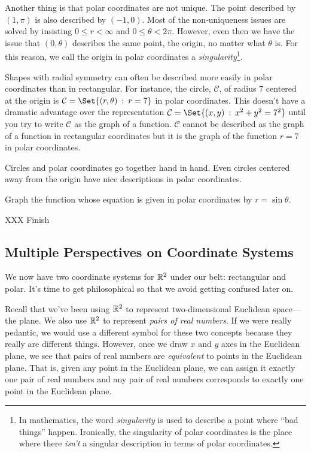 Another thing is that polar coordinates are not unique.  The point described by $(1,\pi)$
is also described by $(-1,0)$.  Most of the non-uniqueness issues are solved by insisting
$0\leq r <\infty$ and $0\leq\theta < 2\pi$.  However, even then we have the issue that
$(0,\theta)$ describes the same point, the origin, no matter what $\theta$ is.  For this reason,
we call the origin in polar coordinates a \emph{singularity}\footnote{ In mathematics, the word
\emph{singularity} is used to describe a point where ``bad things'' happen.  Ironically, the
singularity of polar coordinates is the place where there \emph{isn't} a singular description
in terms of polar coordinates.}.


Shapes with radial symmetry can often be described more easily in polar coordinates than
in rectangular.  For instance, the circle, $\mathcal C$, of radius $7$ centered at the origin is
$\mathcal C=\Set{(r,\theta)\given r=7}$ in polar coordinates.  This doesn't have a dramatic
advantage over the representation $\mathcal C=\Set{(x,y)\given x^2+y^2=7^2}$ until you try to write
$\mathcal C$ as the graph of a function.  $\mathcal C$ cannot be described as the graph of a function
in rectangular coordinates but it is the graph of the function $r=7$ in polar coordinates.

Circles and polar coordinates go together hand in hand.  Even circles centered away from the origin
have nice descriptions in polar coordinates.
\begin{example}
	Graph the function whose equation is given in polar coordinates by $r=\sin\theta$.

	XXX Finish
\end{example}

\subsection{Multiple Perspectives on Coordinate Systems}

We now have two coordinate systems for $\mathbb{R}^2$ under our belt: rectangular and polar.  
It's time to get philosophical so that we avoid getting confused later on.

Recall that we've been using $\mathbb{R}^2$ to represent two-dimensional Euclidean space---the plane.
We also use $\mathbb{R}^2$ to represent \emph{pairs of real numbers}.  If we were really pedantic,
we would use a different symbol for these two concepts because they really are different things.
However, once we draw $x$ and $y$ axes in the Euclidean plane, we see that pairs of real numbers
are \emph{equivalent} to points in the Euclidean plane.  That is, given any point in the Euclidean
plane, we can assign it exactly one pair of real numbers and any pair of real numbers corresponds
to exactly one point in the Euclidean plane.


